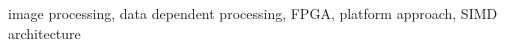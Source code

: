 \documentclass[12pt,a4paper]{IEEEtran}
\begin{document}
  \maketitle

  
\begin{keywords}
 image processing, data dependent processing, 
FPGA, platform approach, SIMD architecture
\end{keywords}

  
  
  
  
  
%  
 



\nocite{schoeberlleros}
\nocite{gaisler2002portable}

\nocite{hennessy1984vlsi}
\nocite{ip2006processor}
\nocite{robinson2010supersmall}
\nocite{niosII}
\nocite{picoblaze}

  
  
\end{document}
